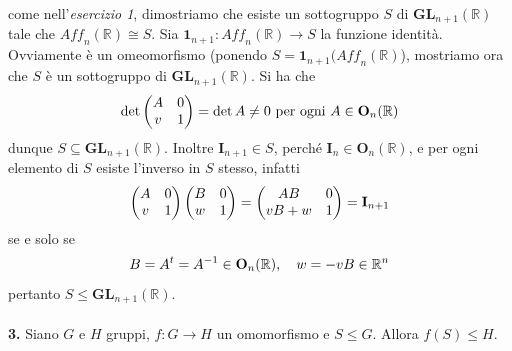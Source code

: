 \documentclass[oneside, 11pt]{amsbook}
\makeatletter
\newcommand{\0}{{(0)}}
\newcommand{\3}{{(3)}}
\theoremstyle{colonplain}
\theoremstyle{colondefinition}
\theoremstyle{colonremark}
\numberwithin{equation}{chapter}
\renewcommand{\proofname}{Dimostrazione}
\renewenvironment{proof}[1][\proofname]{\par
  \pushQED{\qed}%
  \normalfont \topsep6\p@\@plus6\p@\relax
  \trivlist
  \item[\hskip\labelsep\bfseries #1:]\ignorespaces
}{%
  \popQED\endtrivlist\@endpefalse
}
\makeatother
\begin{document}
\begin{proof} come nell'\textit{esercizio 1}, dimostriamo che esiste un sottogruppo $S$ di $\mathbf{GL}_{n + 1}(\mathbb{R})$ tale che $\textit{Aff}_n(\mathbb{R}) \cong S$. Sia $\mathbf{1}_{n + 1} : \textit{Aff}_n(\mathbb{R}) \longrightarrow S$ la funzione identità. Ovviamente è un omeomorfismo (ponendo $S = \mathbf{1}_{n + 1}(\textit{Aff}_n(\mathbb{R})$), mostriamo ora che $S$ è un sottogruppo di $\mathbf{GL}_{n + 1}(\mathbb{R})$. Si ha che
\begin{align}
    \det \begin{pmatrix}
        A & 0 \\
        v & 1
    \end{pmatrix} = \det A \neq 0 \text{ per ogni } A \in \mathbf{O}_n(\mathbb{R}) \notag
\end{align}
dunque $S \subseteq \mathbf{GL}_{n + 1}(\mathbb{R})$. Inoltre $\mathbf{I}_{n + 1} \in S$, perché $\mathbf{I}_n \in \mathbf{O}_n(\mathbb{R})$, e per ogni elemento di $S$ esiste l'inverso in $S$ stesso, infatti
\begin{align}
    \begin{pmatrix}
        A & 0 \\
        v & 1
    \end{pmatrix}
    \begin{pmatrix}
        B & 0 \\
        w & 1
    \end{pmatrix} = 
    \begin{pmatrix}
        AB & 0 \\
        vB + w & 1
    \end{pmatrix} = \mathbf{I}_{n + 1} \notag
\end{align}
se e solo se
\begin{align}
    B = A^t = A^{-1} \in \mathbf{O}_n(\mathbb{R}), \quad w = -vB \in \mathbb{R}^n \notag
\end{align}
pertanto $S \leq \mathbf{GL}_{n + 1}(\mathbb{R})$. \\ \\
\end{proof}
\textbf{3.} Siano $G$ e $H$ gruppi, $f : G \longrightarrow H$ un omomorfismo e $S \leq G$. Allora $f(S) \leq H$. \\
\end{document}
